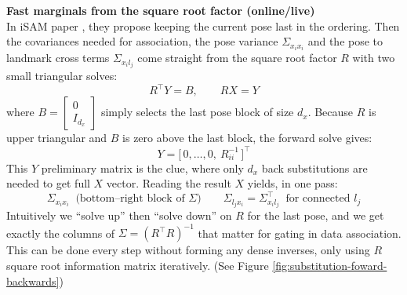 \noindent
\textbf{Fast marginals from the square root factor (online/live)} 
\\ \noindent
In \gls{iSAM} paper \cite{iSAM_paper}, they propose keeping the current pose last in the ordering. Then the covariances needed for association, the pose variance $\Sigma_{x_i x_i}$ and the pose to landmark cross terms $\Sigma_{x_i l_j}$ come straight from the square root factor $R$ with two small triangular solves:
$$
    R^\top Y = B,\qquad R X = Y
$$
where $B=\begin{bmatrix}0\\ I_{d_x}\end{bmatrix}$ simply selects the last pose block of size $d_x$. Because $R$ is upper triangular and $B$ is zero above the last block, the forward solve gives:
$$
Y=\big[\,0,\ldots,0,\ R_{ii}^{-1}\,\big]^\top
$$
This $Y$ preliminary matrix is the clue, where only $d_x$ back substitutions are needed to get full $X$ vector. Reading the result $X$ yields, in one pass:
$$
\Sigma_{x_i x_i} \;\; \text{(bottom–right block of } \Sigma)\qquad
\Sigma_{l_j x_i}=\Sigma_{x_i l_j}^\top \;\; \text{for connected } l_j
$$
Intuitively we ``solve up'' then ``solve down'' on $R$ for the last pose, and we get exactly the columns of $\Sigma=(R^\top R)^{-1}$ that matter for gating in data association. This can be done every step without forming any dense inverses, only using $R$ square root information matrix iteratively. (See Figure \ref{fig:substitution-foward-backwards})
